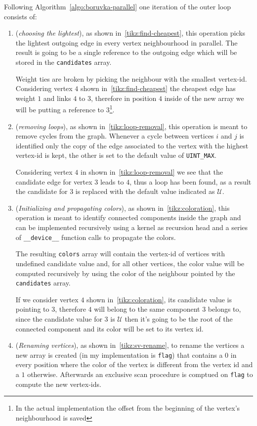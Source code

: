 \documentclass[a4paper,10pt]{article}
\begin{document}
Following Algorithm~\ref{algo:boruvka-parallel} one iteration of the outer loop consists of:
\begin{enumerate}
	\item\label{item:choose-lightest} (\textit{choosing the lightest}), as shown in~\ref{tikz:find-cheapest}, this operation picks the lightest outgoing edge in every vertex neighbourhood in parallel. The result is going to be a single reference to the outgoing edge which will be stored in the \texttt{candidates} array.

	      Weight ties are broken by picking the neighbour with the smallest vertex-id. Considering
	      vertex $4$ shown in~\ref{tikz:find-cheapest} the cheapest edge has weight $1$ and
	      links $4$ to $3$, therefore in position $4$ inside of the new array we will be
	      putting a reference to $3$\footnote{In the actual implementation the offset from the
		      beginning of the vertex's neighbourhood is saved}.
	\item\label{item:mirror-removal} (\textit{removing loops}), as shown in~\ref{tikz:loop-removal}, this operation is meant to remove cycles from the graph. Whenever a cycle between vertices $i$ and $j$ is identified only the copy of the edge associated to the vertex with the highest vertex-id is kept, the other is set to the default value of \texttt{UINT\_MAX}.

	      Considering vertex $4$ in shown in~\ref{tikz:loop-removal} we see that the candidate
	      edge for vertex $3$ leads to $4$, thus a loop has been found, as a result the
	      candidate for $3$ is replaced with the default value indicated as $\mathcal{U}$.
	\item\label{item:coloration} (\textit{Initializing and propagating colors}), as shown in~\ref{tikz:coloration}, this operation is meant to identify connected components inside the graph and can be implemented recursively using a kernel as recursion head and a series of \texttt{\_\_device\_\_} function calls to propagate the colors.

	      The resulting \texttt{colors} array will contain the vertex-id of vertices with undefined candidate value and, for all other vertices, the color value will be computed recursively by using the color of the neighbour pointed by the \texttt{candidates} array.

	      If we consider vertex $4$ shown in~\ref{tikz:coloration}, its candidate value is
	      pointing to $3$, therefore $4$ will belong to the same component $3$ belongs to,
	      since the candidate value for $3$ is $\mathcal{U}$ then it's going to be the root of the
	      connected component and its color will be set to its vertex id.
	\item\label{item:vertex-rename} (\textit{Renaming vertices}), as shown in~\ref{tikz:sv-rename}, to rename the vertices a new array is created (in my implementation is \texttt{flag}) that contains a $0$ in every position where the color of the vertex is different from the vertex id and a $1$ otherwise. Afterwards an exclusive scan procedure is comptued on \texttt{flag} to compute the new vertex-ids.


\end{enumerate}
\end{document}

